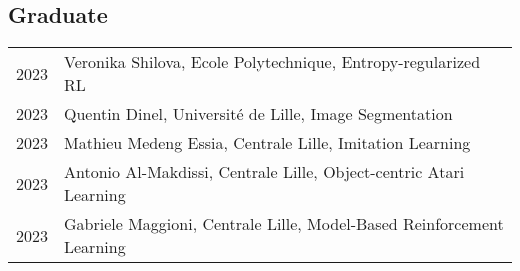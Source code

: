 

\subsection*{Graduate}
\begin{longtable}[l]{@{}p{} p{}}

    2023 & Veronika Shilova, Ecole Polytechnique, Entropy-regularized RL \\
    2023 & Quentin Dinel, Universit\'e de Lille, Image Segmentation \\
    2023 & Mathieu Medeng Essia, Centrale Lille, Imitation Learning \\
    2023 & Antonio Al-Makdissi, Centrale Lille, Object-centric Atari Learning \\
    2023 & Gabriele Maggioni, Centrale Lille, Model-Based Reinforcement Learning

\end{longtable}
